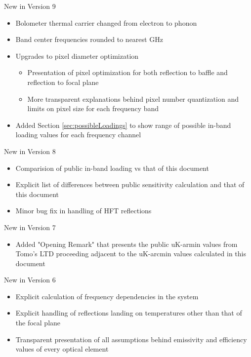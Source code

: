 \documentclass[12pt, titlepage]{article} %
\begin{document}
New in Version 9
\begin{itemize}
	\item Bolometer thermal carrier changed from electron to phonon
	\item Band center frequencies rounded to nearest GHz
	\item Upgrades to pixel diameter optimization
		\begin{itemize}
			\item Presentation of pixel optimization for both reflection to baffle and reflection to focal plane
			\item More transparent explanations behind pixel number quantization and limits on pixel size for each frequency band
		\end{itemize}
	\item Added Section \ref{sec:possibleLoadings} to show range of possible in-band loading values for each frequency channel	
\end{itemize}

New in Version 8
\begin{itemize}
	\item Comparision of public in-band loading vs that of this document
	\item Explicit list of differences between public sensitivity calculation and that of this document
	\item Minor bug fix in handling of HFT reflections
\end{itemize}

New in Version 7
\begin{itemize}
	\item Added "Opening Remark" that presents the public uK-armin values from Tomo's LTD proceeding adjacent to the uK-arcmin values calculated in this document
\end{itemize}

New in Version 6
\begin{itemize}
	\item Explicit calculation of frequency dependencies in the system 
	\item Explicit handling of reflections landing on temperatures other than that of the focal plane
	\item Transparent presentation of all assumptions behind emissivity and efficiency values of every optical element
\end{itemize}

\iffalse
\clearpage
\end{document}

